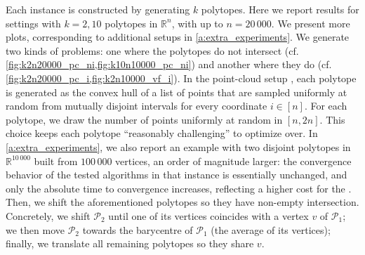 \documentclass[twoside]{article}
\newcommand{\R}{\mathbb{R}}
\newcommand{\mP}{\mathcal{P}}
\begin{document}
Each instance is constructed by generating $k$ polytopes.
Here we report results for settings with $k = 2, 10$ polytopes in $\R^n$, with up to $n = 20\,000$. We present more plots, corresponding to additional setups in \cref{a:extra_experiments}. 
We generate two kinds of problems: one where the polytopes do not intersect (cf. \cref{fig:k2n20000_pc_ni,fig:k10n10000_pc_ni}) and another where they do (cf. \cref{fig:k2n20000_pc_i,fig:k2n10000_vf_i}). 
In the point-cloud setup , each polytope is generated as the convex hull of a list of points that are sampled uniformly at random from mutually disjoint intervals for every coordinate $i \in [n]$.
For each polytope, we draw the number of points uniformly at random in $[n, 2n]$. This choice keeps each polytope ``reasonably challenging'' to optimize over.
In \cref{a:extra_experiments}, we also report an example with two disjoint polytopes in $\R^{10\,000}$ built from $100\,000$ vertices, an order of magnitude larger: the convergence behavior of the tested algorithms in that instance is essentially unchanged, and only the absolute time to convergence increases, reflecting a higher cost for the \LMO{}.
Then, we shift the aforementioned polytopes %
so they 
have non-empty intersection. 
Concretely,  we shift $\mP_2$ until one of its vertices coincides with a vertex $v$ of $\mP_1$; we then move $\mP_2$ towards the barycentre of $\mP_1$ (the average of its vertices); finally, we translate all remaining polytopes so they share $v$. 
\end{document}
